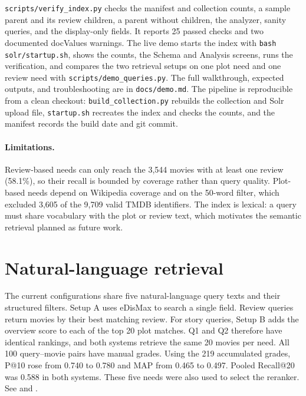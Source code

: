 \documentclass[sigconf]{acmart}
\begin{document}
\texttt{scripts/verify\_index.py} checks the manifest and collection counts, a
sample parent and its review children, a parent without children, the analyzer,
sanity queries, and the display-only fields. It reports 25 passed checks and two
documented docValues warnings. The live demo starts the index with
\texttt{bash solr/startup.sh}, shows the counts, the Schema and Analysis screens,
runs the verification, and compares the two retrieval setups on one plot need and
one review need with \texttt{scripts/demo\_queries.py}. The full walkthrough, expected
outputs, and troubleshooting are in \texttt{docs/demo.md}. The pipeline is
reproducible from a clean checkout: \texttt{build\_collection.py} rebuilds the
collection and Solr upload file, \texttt{startup.sh} recreates the index and checks
the counts, and the manifest records the build date and git commit.

\paragraph{Limitations.} Review-based needs can only reach the 3{,}544 movies with
at least one review (58.1\%), so their recall is bounded by coverage rather than
query quality. Plot-based needs depend on Wikipedia coverage and on the 50-word
filter, which excluded 3{,}605 of the 9{,}709 valid TMDB identifiers. The index is
lexical: a query must share vocabulary with the plot or review text, which motivates
the semantic retrieval planned as future work.



\section{Natural-language retrieval}

The current configurations share five natural-language query texts and their
structured filters. Setup A uses eDisMax to search a single field. Review
queries return movies by their best matching review. For story queries, Setup B
adds the overview score to each of the top 20 plot matches. Q1 and Q2 therefore
have identical rankings, and both systems retrieve the same 20 movies per need.
All 100 query--movie pairs have manual grades. Using the 219 accumulated grades,
P@10 rose from 0.740 to 0.780 and MAP from 0.465 to 0.497. Pooled Recall@20 was
0.588 in both systems. These five needs were also used to select the reranker.
See  and .
\end{document}

